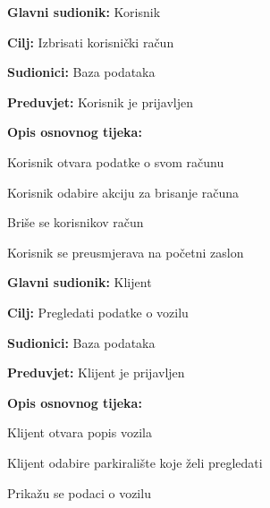\noindent {}
\begin{packed_item}
	
	\item \textbf{Glavni sudionik:} Korisnik
	\item  \textbf{Cilj:} Izbrisati korisnički račun
	\item  \textbf{Sudionici:} Baza podataka
	\item  \textbf{Preduvjet:} Korisnik je prijavljen
	\item  \textbf{Opis osnovnog tijeka:}
	
	\item[] \begin{packed_enum}
		
		\item Korisnik otvara podatke o svom računu
		\item Korisnik odabire akciju za brisanje računa
		\item Briše se korisnikov račun
		\item Korisnik se preusmjerava na početni zaslon
		
	\end{packed_enum}
\end{packed_item}

\noindent {}
\begin{packed_item}
	
	\item \textbf{Glavni sudionik:} Klijent
	\item \textbf{Cilj:} Pregledati podatke o vozilu
	\item \textbf{Sudionici:} Baza podataka
	\item \textbf{Preduvjet:} Klijent je prijavljen
	\item \textbf{Opis osnovnog tijeka:}
	
	\item[] \begin{packed_enum}
		
		\item Klijent otvara popis vozila
		\item Klijent odabire parkiralište koje želi pregledati
		\item Prikažu se podaci o vozilu
	
	\end{packed_enum}
\end{packed_item}

